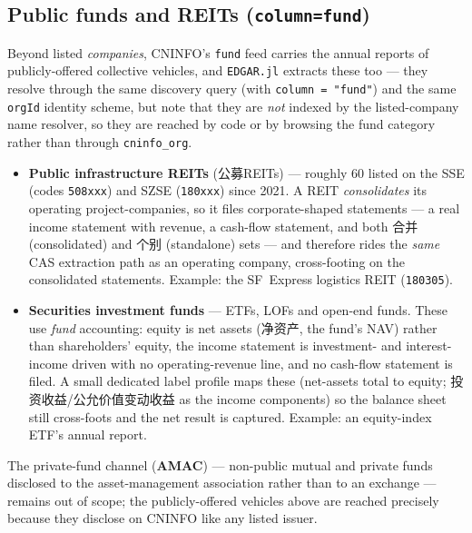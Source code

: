 \documentclass[11pt,a4paper]{report}
\newcommand{\cncjk}[2]{{\cjkCNfont #1}}
\begin{document}
\subsection{Public funds and REITs (\texttt{column=fund})}\label{sec:china-funds}
Beyond listed \emph{companies}, CNINFO's \texttt{fund} feed carries the annual reports of publicly-offered
collective vehicles, and \texttt{EDGAR.jl} extracts these too --- they resolve through the same discovery
query (with \texttt{column\ =\ "fund"}) and the same \texttt{orgId} identity scheme, but note that they are
\emph{not} indexed by the listed-company name resolver, so they are reached by code or by browsing the fund
category rather than through \texttt{cninfo\_org}.
\begin{itemize}
  \item \textbf{Public infrastructure REITs} (\cncjk{公募REITs}{}) --- roughly 60 listed on the SSE (codes
    \texttt{508xxx}) and SZSE (\texttt{180xxx}) since 2021. A REIT \emph{consolidates} its operating
    project-companies, so it files corporate-shaped statements --- a real income statement with revenue, a
    cash-flow statement, and both \cncjk{合并}{} (consolidated) and \cncjk{个别}{} (standalone) sets --- and
    therefore rides the \emph{same} CAS extraction path as an operating company, cross-footing on the
    consolidated statements. Example: the SF~Express logistics REIT (\texttt{180305}).
  \item \textbf{Securities investment funds} --- ETFs, LOFs and open-end funds. These use \emph{fund}
    accounting: equity is net assets (\cncjk{净资产}{}, the fund's NAV) rather than shareholders' equity, the
    income statement is investment- and interest-income driven with no operating-revenue line, and no
    cash-flow statement is filed. A small dedicated label profile maps these (net-assets total to equity;
    \cncjk{投资收益}{}/\cncjk{公允价值变动收益}{} as the income components) so the balance sheet still
    cross-foots and the net result is captured. Example: an equity-index ETF's annual report.
\end{itemize}
The private-fund channel (\textbf{AMAC}) --- non-public mutual and private funds disclosed to the
asset-management association rather than to an exchange --- remains out of scope; the publicly-offered
vehicles above are reached precisely because they disclose on CNINFO like any listed issuer.
\end{document}
